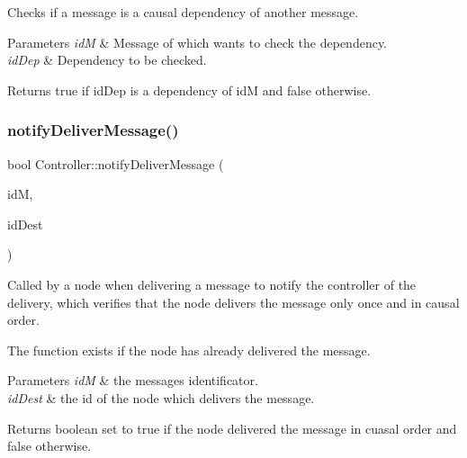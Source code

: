 Checks if a message is a causal dependency of another message. 


\begin{DoxyParams}{Parameters}
{\em idM} & Message of which wants to check the dependency. \\
\hline
{\em id\+Dep} & Dependency to be checked. \\
\hline
\end{DoxyParams}
\begin{DoxyReturn}{Returns}
true if id\+Dep is a dependency of idM and false otherwise. 
\end{DoxyReturn}
\mbox{\label{class_controller_a8905abf1976e737410ac0142001e38a0}} 
\subsubsection{\texorpdfstring{notify\+Deliver\+Message()}{notifyDeliverMessage()}}
{\footnotesize\ttfamily bool Controller\+::notify\+Deliver\+Message (\begin{DoxyParamCaption}\item[{\hyperlink{structures_8h_a83a1d9a070efa5341da84cfd8e28d3e5}{id\+Msg}}]{idM,  }\item[{unsigned int}]{id\+Dest }\end{DoxyParamCaption})}



Called by a node when delivering a message to notify the controller of the delivery, which verifies that the node delivers the message only once and in causal order. 

The function exists if the node has already delivered the message. 
\begin{DoxyParams}{Parameters}
{\em idM} & the message\textquotesingle{}s identificator. \\
\hline
{\em id\+Dest} & the id of the node which delivers the message. \\
\hline
\end{DoxyParams}
\begin{DoxyReturn}{Returns}
boolean set to true if the node delivered the message in cuasal order and false otherwise. 
\end{DoxyReturn}
\mbox{\label{class_controller_a7207304a07534e50a690f26c765b4a71}} 
